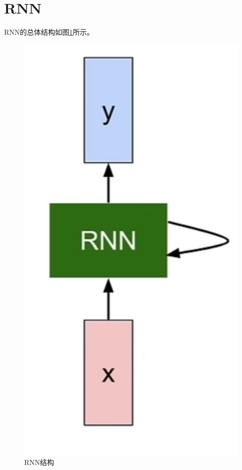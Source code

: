 \section{RNN}
    RNN的总体结构如图\ref{fig:rnnarchitecture}所示。

    \begin{figure}[H]
        \centering
        \includegraphics[width=0.07\textheight]{./figures/rnnarchitecture.jpg}
        \caption{RNN结构}
        \label{fig:rnnarchitecture}
    \end{figure}

